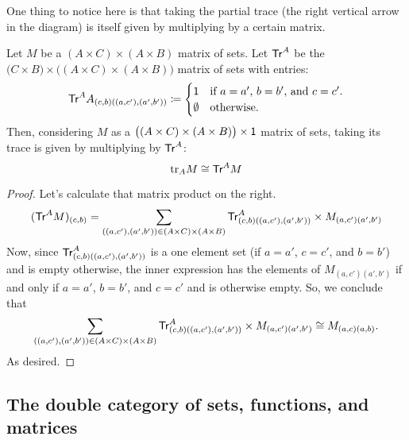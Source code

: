 \documentclass[DynamicalBook]{subfiles}
\begin{document}
One thing to notice here is that taking the partial trace (the right vertical
arrow in the diagram) is itself given by multiplying by a certain matrix.
\begin{proposition}\label{prop.trace_multiplying_by_matrix}
  Let $M$ be a $(A \times C) \times (A \times B)$ matrix of sets. Let
  $\mathsf{Tr}^A$ be the $\big(C \times B \big) \times \big((A \times C) \times (A
  \times B)\big)$ matrix of sets with entries:
  \[
    \mathsf{Tr}^A{A}_{(c, b)((a,c'),(a', b'))} \coloneqq \begin{cases} 
      \mathsf{1} &\mbox{if $a = a'$, $b = b'$, and $c = c'$.} \\
      \emptyset &\mbox{otherwise.}
    \end{cases} 
\]
  Then, considering $M$ as a $\big((A \times C) \times (A \times B)\big) \times
  \mathsf{1}$ matrix of sets, taking its trace is given by multiplying by $\mathsf{Tr}^A$:
$$\mathrm{tr}_{A}M \cong \mathsf{Tr}^A M$$
\end{proposition}
\begin{proof}
  Let's calculate that matrix product on the right.
  \begin{align*}
    (\mathsf{Tr}^A M)_{(c, b)} &= \sum_{((a, c'), (a', b')) \in (A \times C) \times (A \times B)} \mathsf{Tr}^A_{(c,b)((a, c'),(a', b'))} \times M_{(a,c')(a',b')} \\
  \end{align*}
  Now, since $\mathsf{Tr}^A_{(c,b)((a,c'),(a',b'))}$ is a one element set (if $a =
  a'$, $c = c'$, and $b = b'$) and is empty otherwise, the inner expression has
  the elements of $M_{(a,c')(a', b')}$ if and only if $a = a'$, $b = b'$, and $c
  = c'$ and is otherwise empty. So, we conclude that
  \[
\sum_{((a, c'), (a', b')) \in (A \times C) \times (A \times B)}
\mathsf{Tr}^A_{(c,b)((a, c'),(a', b'))} \times M_{(a,c')(a',b')} \cong M_{(a, c)(a,
  b)}.
\]
As desired.
\end{proof}



\subsection{The double category of sets, functions, and matrices}\label{sec.double_cat_of_matrices}
\end{document}
